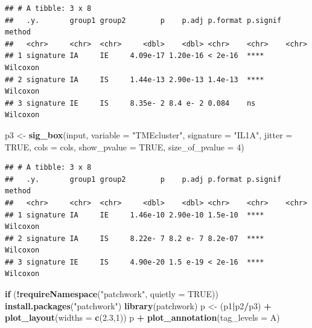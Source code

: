 \documentclass[
  12pt,
]{book}
\newenvironment{Shaded}{\begin{snugshade}}{\end{snugshade}}
\newcommand{\AttributeTok}[1]{\textcolor[rgb]{0.13,0.29,0.53}{#1}}
\newcommand{\ConstantTok}[1]{\textcolor[rgb]{0.56,0.35,0.01}{#1}}
\newcommand{\ControlFlowTok}[1]{\textcolor[rgb]{0.13,0.29,0.53}{\textbf{#1}}}
\newcommand{\DecValTok}[1]{\textcolor[rgb]{0.00,0.00,0.81}{#1}}
\newcommand{\FloatTok}[1]{\textcolor[rgb]{0.00,0.00,0.81}{#1}}
\newcommand{\FunctionTok}[1]{\textcolor[rgb]{0.13,0.29,0.53}{\textbf{#1}}}
\newcommand{\NormalTok}[1]{#1}
\newcommand{\OtherTok}[1]{\textcolor[rgb]{0.56,0.35,0.01}{#1}}
\newcommand{\SpecialCharTok}[1]{\textcolor[rgb]{0.81,0.36,0.00}{\textbf{#1}}}
\newcommand{\StringTok}[1]{\textcolor[rgb]{0.31,0.60,0.02}{#1}}
\begin{document}
\begin{verbatim}
## # A tibble: 3 x 8
##   .y.       group1 group2        p    p.adj p.format p.signif method  
##   <chr>     <chr>  <chr>     <dbl>    <dbl> <chr>    <chr>    <chr>   
## 1 signature IA     IE     4.09e-17 1.20e-16 < 2e-16  ****     Wilcoxon
## 2 signature IA     IS     1.44e-13 2.90e-13 1.4e-13  ****     Wilcoxon
## 3 signature IE     IS     8.35e- 2 8.4 e- 2 0.084    ns       Wilcoxon
\end{verbatim}

\begin{Shaded}
\begin{Highlighting}[]
\NormalTok{p3 }\OtherTok{\textless{}{-}} \FunctionTok{sig\_box}\NormalTok{(input, }\AttributeTok{variable =} \StringTok{"TMEcluster"}\NormalTok{, }\AttributeTok{signature =} \StringTok{"IL1A"}\NormalTok{, }
              \AttributeTok{jitter =} \ConstantTok{TRUE}\NormalTok{, }\AttributeTok{cols =}\NormalTok{  cols, }\AttributeTok{show\_pvalue =} \ConstantTok{TRUE}\NormalTok{, }\AttributeTok{size\_of\_pvalue =} \DecValTok{4}\NormalTok{)}
\end{Highlighting}
\end{Shaded}

\begin{verbatim}
## # A tibble: 3 x 8
##   .y.       group1 group2        p    p.adj p.format p.signif method  
##   <chr>     <chr>  <chr>     <dbl>    <dbl> <chr>    <chr>    <chr>   
## 1 signature IA     IE     1.46e-10 2.90e-10 1.5e-10  ****     Wilcoxon
## 2 signature IA     IS     8.22e- 7 8.2 e- 7 8.2e-07  ****     Wilcoxon
## 3 signature IE     IS     4.90e-20 1.5 e-19 < 2e-16  ****     Wilcoxon
\end{verbatim}

\begin{Shaded}
\begin{Highlighting}[]
\ControlFlowTok{if}\NormalTok{ (}\SpecialCharTok{!}\FunctionTok{requireNamespace}\NormalTok{(}\StringTok{"patchwork"}\NormalTok{, }\AttributeTok{quietly =} \ConstantTok{TRUE}\NormalTok{))   }\FunctionTok{install.packages}\NormalTok{(}\StringTok{"patchwork"}\NormalTok{)}
\FunctionTok{library}\NormalTok{(patchwork)}
\NormalTok{p }\OtherTok{\textless{}{-}}\NormalTok{ (p1}\SpecialCharTok{|}\NormalTok{p2}\SpecialCharTok{/}\NormalTok{p3) }\SpecialCharTok{+} \FunctionTok{plot\_layout}\NormalTok{(}\AttributeTok{widths =} \FunctionTok{c}\NormalTok{(}\FloatTok{2.3}\NormalTok{,}\DecValTok{1}\NormalTok{))}
\NormalTok{p }\SpecialCharTok{+} \FunctionTok{plot\_annotation}\NormalTok{(}\AttributeTok{tag\_levels =} \StringTok{\textquotesingle{}A\textquotesingle{}}\NormalTok{)}
\end{Highlighting}
\end{Shaded}
\end{document}
